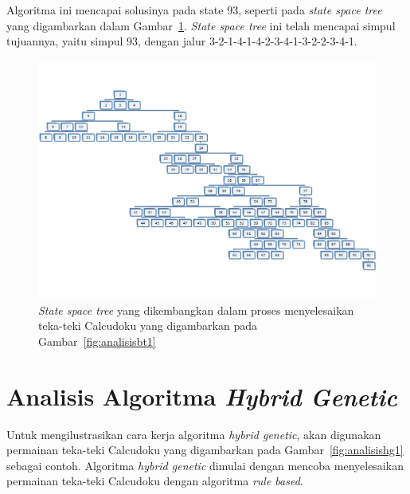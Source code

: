 Algoritma ini mencapai solusinya pada state 93, seperti pada \textit{state space tree} yang digambarkan dalam Gambar~\ref{fig:analisisbt33}. \textit{State space tree} ini telah mencapai simpul tujuannya, yaitu simpul 93, dengan jalur 3-2-1-4-1-4-2-3-4-1-3-2-2-3-4-1.

\begin{landscape}
\begin{figure}
\centering
\captionsetup{justification=centering}
\includegraphics[scale=0.75]{Gambar/backtracking/StateSpaceTree}
\caption[\textit{State space tree} yang dikembangkan dalam proses menyelesaikan teka-teki Calcudoku yang digambarkan pada Gambar~\ref{fig:analisisbt1}]{\textit{State space tree} yang dikembangkan dalam proses menyelesaikan teka-teki Calcudoku yang digambarkan pada Gambar~\ref{fig:analisisbt1}}
\label{fig:analisisbt33}
\end{figure}
\end{landscape}

\section{Analisis Algoritma \textit{Hybrid Genetic}}
\label{sec:analisishg}

Untuk mengilustrasikan cara kerja algoritma \textit{hybrid genetic}, akan digunakan permainan teka-teki Calcudoku yang digambarkan pada Gambar~\ref{fig:analisishg1} sebagai contoh. Algoritma \textit{hybrid genetic} dimulai dengan mencoba menyelesaikan permainan teka-teki Calcudoku dengan algoritma \textit{rule based}.


